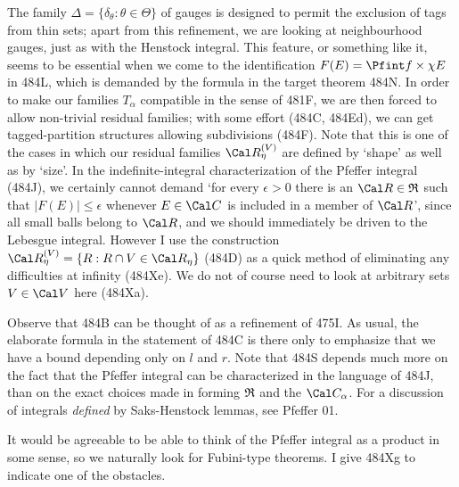 {The family $\Delta=\{\delta_{\theta}:\theta\in\Theta\}$ of gauges is
designed to permit the exclusion of tags from thin sets;  apart from this
refinement, we are looking at neighbourhood gauges, just as with the
Henstock integral.   This feature, or something like it,
seems to be essential when we come to
the identification $F(E)=\Pfint f\times\chi E$ in 484L, which is demanded
by the formula in the target theorem 484N.   In order to make our
families $T_{\alpha}$ compatible in the sense of 481F, we are
then forced to allow non-trivial residual families;
with some effort (484C, 484Ed), we can
get tagged-partition structures allowing subdivisions (484F).
Note that this is one of the
cases in which our residual families $\Cal R^{(V)}_{\eta}$ are defined by
`shape' as well as by `size'.   In the indefinite-integral characterization
of the Pfeffer integral (484J), we certainly cannot demand `for every
$\epsilon>0$ there is an $\Cal R\in\frak R$ such that $|F(E)|\le\epsilon$
whenever $E\in\Cal C$ is included in a member of $\Cal R$', since all
small balls belong to $\Cal R$, and we should immediately be driven to the
Lebesgue integral.   However I use the construction
$\Cal R^{(V)}_{\eta}=\{R:R\cap V\in\Cal R_{\eta}\}$ (484D) as a quick
method of eliminating any difficulties at infinity (484Xe).   We do not
of course need to look at arbitrary sets $V\in\Cal V$ here (484Xa).

Observe that 484B can be thought of as a refinement of 475I.
As usual, the elaborate formula in the statement of 484C is there only
to emphasize that we have a bound depending only on $l$ and $r$.
Note that 484S depends much more on the fact that the Pfeffer integral can
be characterized in the language of 484J, than on the exact choices made
in forming $\frak R$ and the $\Cal C_{\alpha}$.   For a
discussion of integrals {\it defined} by Saks-Henstock lemmas, see
{\smc Pfeffer 01}.

It would be agreeable to be able to think of the Pfeffer integral as a
product in some sense, so we naturally look for Fubini-type theorems.
I give 484Xg to indicate one of the obstacles.
}%


\discrpage

